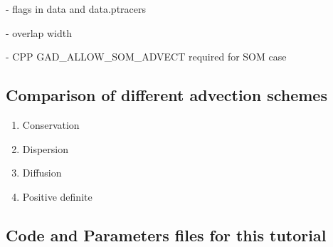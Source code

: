 - flags in data and data.ptracers

- overlap width

- CPP GAD\_ALLOW\_SOM\_ADVECT required for SOM case

\subsection{Comparison of different advection schemes}

\begin{enumerate}
\item{Conservation}
\item{Dispersion}
\item{Diffusion}
\item{Positive definite}
\end{enumerate}

\subsection{Code and Parameters files for this tutorial}
 






